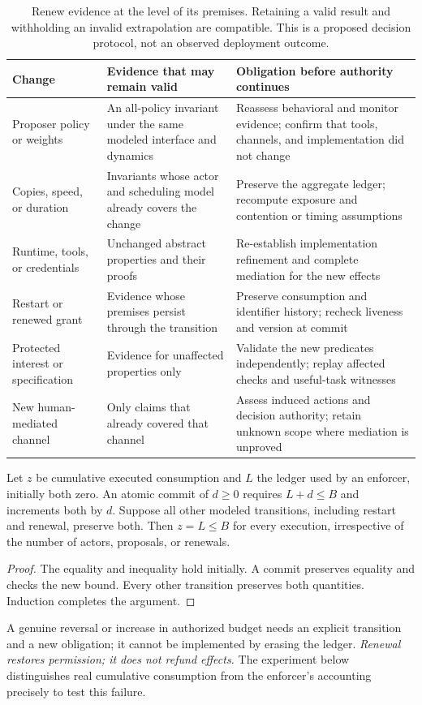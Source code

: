\begin{table}[t]
\centering\small
\begin{tabularx}{\textwidth}{@{}P{.19\textwidth}LL@{}}
\toprule
\textbf{Change} & \textbf{Evidence that may remain valid} & \textbf{Obligation before authority continues}\\
\midrule
Proposer policy or weights & An all-policy invariant under the same modeled interface and dynamics & Reassess behavioral and monitor evidence; confirm that tools, channels, and implementation did not change\\
Copies, speed, or duration & Invariants whose actor and scheduling model already covers the change & Preserve the aggregate ledger; recompute exposure and contention or timing assumptions\\
Runtime, tools, or credentials & Unchanged abstract properties and their proofs & Re-establish implementation refinement and complete mediation for the new effects\\
Restart or renewed grant & Evidence whose premises persist through the transition & Preserve consumption and identifier history; recheck liveness and version at commit\\
Protected interest or specification & Evidence for unaffected properties only & Validate the new predicates independently; replay affected checks and useful-task witnesses\\
New human-mediated channel & Only claims that already covered that channel & Assess induced actions and decision authority; retain unknown scope where mediation is unproved\\
\bottomrule
\end{tabularx}
\caption{Renew evidence at the level of its premises. Retaining a valid result and withholding an invalid extrapolation are compatible. This is a proposed decision protocol, not an observed deployment outcome.}
\label{tab:renewal}
\end{table}

\begin{lemma}
\label{lem:ledger}
Let $z$ be cumulative executed consumption and $L$ the ledger used by an enforcer, initially both zero. An atomic commit of $d\ge0$ requires $L+d\le B$ and increments both by $d$. Suppose all other modeled transitions, including restart and renewal, preserve both. Then $z=L\le B$ for every execution, irrespective of the number of actors, proposals, or renewals.
\end{lemma}
\begin{proof}
The equality and inequality hold initially. A commit preserves equality and checks the new bound. Every other transition preserves both quantities. Induction completes the argument.
\end{proof}
A genuine reversal or increase in authorized budget needs an explicit transition and a new obligation; it cannot be implemented by erasing the ledger. \emph{Renewal restores permission; it does not refund effects.} The experiment below distinguishes real cumulative consumption from the enforcer's accounting precisely to test this failure.

